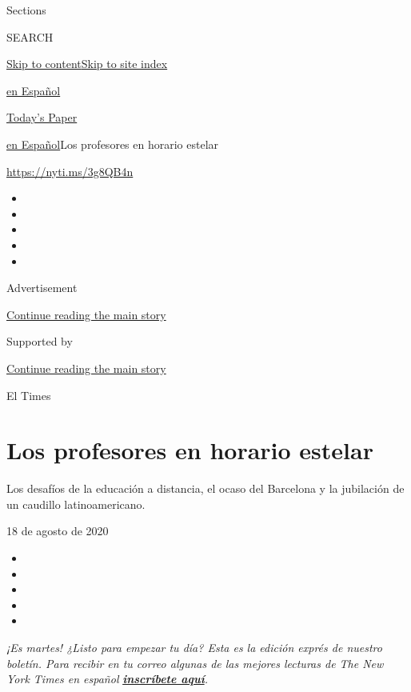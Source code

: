 Sections

SEARCH

\protect\hyperlink{site-content}{Skip to
content}\protect\hyperlink{site-index}{Skip to site index}

\href{https://www.nytimes3xbfgragh.onion/es/}{en Español}

\href{https://myaccount.nytimes3xbfgragh.onion/auth/login?response_type=cookie\&client_id=vi}{}

\href{https://www.nytimes3xbfgragh.onion/section/todayspaper}{Today's
Paper}

\href{/es/}{en Español}\textbar{}Los profesores en horario estelar

\url{https://nyti.ms/3g8QB4n}

\begin{itemize}
\item
\item
\item
\item
\item
\end{itemize}

Advertisement

\protect\hyperlink{after-top}{Continue reading the main story}

Supported by

\protect\hyperlink{after-sponsor}{Continue reading the main story}

El Times

\hypertarget{los-profesores-en-horario-estelar}{%
\section{Los profesores en horario
estelar}\label{los-profesores-en-horario-estelar}}

Los desafíos de la educación a distancia, el ocaso del Barcelona y la
jubilación de un caudillo latinoamericano.

18 de agosto de 2020

\begin{itemize}
\item
\item
\item
\item
\item
\end{itemize}

\emph{¡Es martes! ¿Listo para empezar tu día? Esta es la edición exprés
de nuestro boletín. Para recibir en tu correo algunas de las mejores
lecturas de The New York Times en español}
\textbf{\href{https://www.nytimes3xbfgragh.onion/newsletters/el-times}{\emph{inscríbete
aquí}}}\emph{.}

